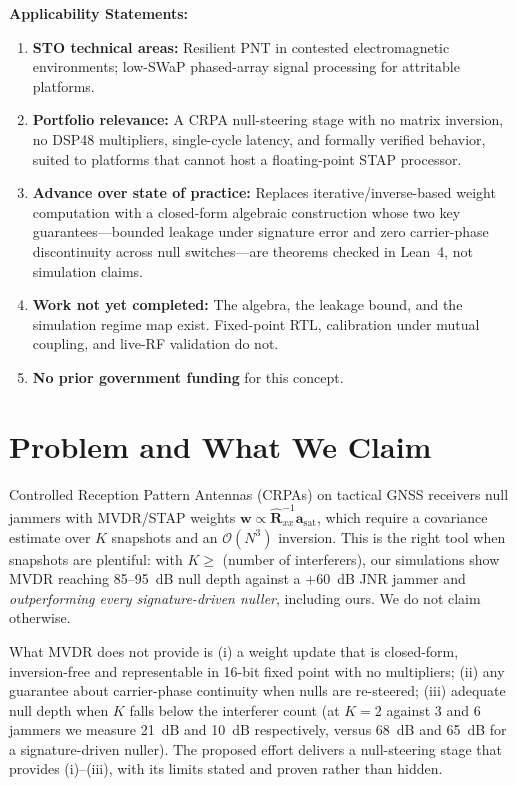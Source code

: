 \documentclass[12pt,letterpaper]{article}
\begin{document}
\vspace{4pt}
\textbf{Applicability Statements:}
\begin{enumerate}[leftmargin=16pt,itemsep=1pt,topsep=1pt]
    \item \textbf{STO technical areas:} Resilient PNT in contested electromagnetic environments; low-SWaP phased-array signal processing for attritable platforms.
    \item \textbf{Portfolio relevance:} A CRPA null-steering stage with no matrix inversion, no DSP48 multipliers, single-cycle latency, and formally verified behavior, suited to platforms that cannot host a floating-point STAP processor.
    \item \textbf{Advance over state of practice:} Replaces iterative/inverse-based weight computation with a closed-form algebraic construction whose two key guarantees---bounded leakage under signature error and zero carrier-phase discontinuity across null switches---are theorems checked in Lean~4, not simulation claims.
    \item \textbf{Work not yet completed:} The algebra, the leakage bound, and the simulation regime map exist. Fixed-point RTL, calibration under mutual coupling, and live-RF validation do not.
    \item \textbf{No prior government funding} for this concept.
\end{enumerate}

\newpage
{}
\setcounter{page}{1}

\section{Problem and What We Claim}
Controlled Reception Pattern Antennas (CRPAs) on tactical GNSS receivers null jammers with MVDR/STAP weights $\mathbf{w}\propto\hat{\mathbf{R}}_{xx}^{-1}\mathbf{a}_{\mathrm{sat}}$, which require a covariance estimate over $K$ snapshots and an $\mathcal{O}(N^3)$ inversion. This is the right tool when snapshots are plentiful: with $K\ge$ (number of interferers), our simulations show MVDR reaching 85--95~dB null depth against a $+60$~dB JNR jammer and \emph{outperforming every signature-driven nuller}, including ours. We do not claim otherwise.

What MVDR does not provide is (i) a weight update that is closed-form, inversion-free and representable in 16-bit fixed point with no multipliers; (ii) any guarantee about carrier-phase continuity when nulls are re-steered; (iii) adequate null depth when $K$ falls below the interferer count (at $K=2$ against 3 and 6 jammers we measure 21~dB and 10~dB respectively, versus 68~dB and 65~dB for a signature-driven nuller). The proposed effort delivers a null-steering stage that provides (i)--(iii), with its limits stated and proven rather than hidden.
\end{document}
